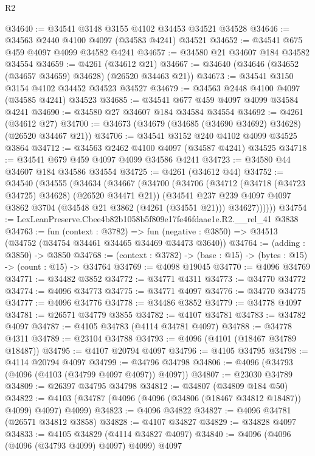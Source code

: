 \begin{lexlean}{R2}
\begin{coremodule}
@34640 := @34541 @3148 @3155 @4102 @34453 @34521 @34528
@34646 := @34563 @2440 @4100 @4097 (@34583 @4241) @34521
@34652 := @34541 @675 @459 @4097 @4099 @34582 @4241
@34657 := @34580 @21 @34607 @184 @34582 @34554
@34659 := @4261 (@34612 @21)
@34667 := @34640 (@34646 (@34652 (@34657 @34659) @34628) (@26520 @34463 @21))
@34673 := @34541 @3150 @3154 @4102 @34452 @34523 @34527
@34679 := @34563 @2448 @4100 @4097 (@34585 @4241) @34523
@34685 := @34541 @677 @459 @4097 @4099 @34584 @4241
@34690 := @34580 @27 @34607 @184 @34584 @34554
@34692 := @4261 (@34612 @27)
@34700 := @34673 (@34679 (@34685 (@34690 @34692) @34628) (@26520 @34467 @21))
@34706 := @34541 @3152 @240 @4102 @4099 @34525 @3864
@34712 := @34563 @2462 @4100 @4097 (@34587 @4241) @34525
@34718 := @34541 @679 @459 @4097 @4099 @34586 @4241
@34723 := @34580 @44 @34607 @184 @34586 @34554
@34725 := @4261 (@34612 @44)
@34752 := @34540
    (@34555
      (@34634
        (@34667
          (@34700
            (@34706
              (@34712 (@34718 (@34723 @34725) @34628) (@26520 @34471 @21))
              (@34541
                @237
                @239
                @4097
                @4097
                @3862
                @3704
                (@34548 @21 @3862 (@4261 (@34551 @21)))
                @34627))))))
@34754 := LexLeanPreserve.Cbee4b82b1058b5f809e17fe46fdaae1e.R2.__rel_41 @3838
@34763 := fun (context : @3782) =>
  fun (negative : @3850) => @34513 (@34752 (@34754 @34461 @34465 @34469 @34473 @3640))
@34764 := (adding : @3850) -> @3850
@34768 := (context : @3782) -> (base : @15) -> (bytes : @15) -> (count : @15) -> @34764
@34769 := @4098 @19045
@34770 := @4096 @34769
@34771 := @34482 @3852
@34772 := @34771 @4311
@34773 := @34770 @34772
@34774 := @4096 @34773
@34775 := @34771 @4097
@34776 := @34770 @34775
@34777 := @4096 @34776
@34778 := @34486 @3852
@34779 := @34778 @4097
@34781 := @26571 @34779 @3855
@34782 := @4107 @34781
@34783 := @34782 @4097
@34787 := @4105 @34783 (@4114 @34781 @4097)
@34788 := @34778 @4311
@34789 := @23104 @34788
@34793 := @4096 (@4101 (@18467 @34789 @18487))
@34795 := @4107 @20794 @4097
@34796 := @4105 @34795
@34798 := @4114 @20794 @4097
@34799 := @34796 @34798
@34806 := @4096 (@34793 (@4096 (@4103 (@34799 @4097 @4097)) @4097))
@34807 := @23030 @34789
@34809 := @26397 @34795 @34798
@34812 := @34807 (@34809 @184 @50)
@34822 := @4103 (@34787 (@4096 (@4096 (@34806 (@18467 @34812 @18487)) @4099) @4097) @4099)
@34823 := @4096 @34822
@34827 := @4096 @34781 (@26571 @34812 @3858)
@34828 := @4107 @34827
@34829 := @34828 @4097
@34833 := @4105 @34829 (@4114 @34827 @4097)
@34840 := @4096 (@4096 (@4096 (@34793 @4099) @4097) @4099) @4097

\end{coremodule}
\end{lexlean}
